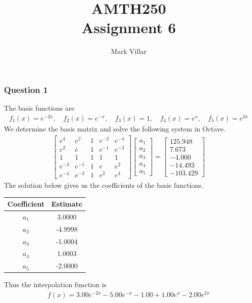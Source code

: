 \documentclass[11pt,a4paper]{article}
\title{AMTH250 \\ Assignment 6}
\author{Mark Villar}
\begin{document}
\maketitle

\subsubsection*{Question 1} 
The basis functions are
\begin{align*}
	f_{1}(x)=e^{-2x}, \quad f_{2}(x)=e^{-x}, \quad f_{3}(x)=1, \quad f_{4}(x)=e^{x}, \quad f_{5}(x)=e^{2x}
\end{align*}
We determine the basis matrix and solve the following system in Octave.
\begin{align*}
	\begin{bmatrix}
		e^{4} &e^{2} &1 &e^{-2} &e^{-4} \\
		e^{2} &e &1 &e^{-1} &e^{-2} \\
		1 &1 &1 &1 &1\\
		e^{-2} &e^{-1} &1 &e &e^{2} \\
		e^{-4} &e^{-2} &1 &e^{2} &e^{4}
	\end{bmatrix} 
	\begin{bmatrix}
		a_{1} \\
		a_{2} \\
		a_{3} \\
		a_{4} \\
		a_{5}
	\end{bmatrix} =
	\begin{bmatrix}
		125.948 \\
		7.673 \\
		-4.000 \\
		-14.493 \\
		-103.429
	\end{bmatrix}
\end{align*}
The solution below gives us the coefficients of the basis functions.
\begin{center}
	\begin{tabular}{|c|c|}
	\hline
	Coefficient &Estimate \\
	\hline
	$a_1$ &3.0000 \\
	$a_2$ &-4.9998 \\
	$a_3$ &-1.0004 \\
	$a_4$ &1.0003 \\
	$a_5$ &-2.0000 \\
	\hline
	\end{tabular}
\end{center}
Thus the interpolation function is
\begin{align*}
	f(x)=3.00e^{-2x}-5.00e^{-x}-1.00+1.00e^{x}-2.00e^{2x}
\end{align*}
\end{document}
